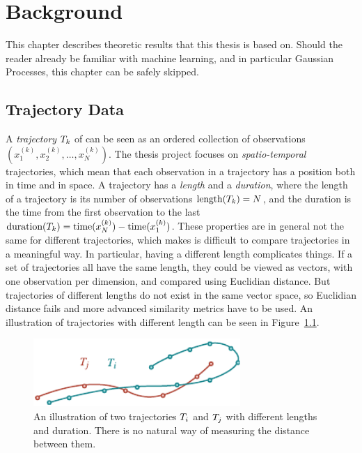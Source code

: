 \chapter{Background}
This chapter describes theoretic results that this thesis is based
on. Should the reader already be familiar with machine learning, and
in particular Gaussian Processes, this chapter can be safely skipped.

\section{Trajectory Data}
A \textit{trajectory} $T_{k}$ of can be seen as an ordered collection of
observations $(x^{(k)}_1, x^{(k)}_2, \dots, x^{(k)}_N)$.
The thesis project focuses on \textit{spatio-temporal}
trajectories, which mean that each observation in a trajectory has a position both in time
and in space. A trajectory has a \textit{length} and
a \textit{duration}, where the length of a trajectory is its number of
observations $\text{length}(T_{k}) = N$, and the duration is the time from the first
observation to the last $\text{duration}(T_{k}) = \text{time}(x^{(k)}_N) - \text{time}(x^{(k)}_1)$. 
These properties are in general not the same for different
trajectories, which makes is difficult to compare trajectories in a
meaningful way. In particular, having a different length complicates
things. If a set of trajectories all have the same length, they could
be viewed as vectors, with one observation per dimension, and compared
using Euclidian distance. But trajectories of different lengths do not
exist in the same vector space, so Euclidian distance fails and more
advanced similarity metrics have to be used.
An illustration of trajectories with different length can be seen in Figure~\ref{fig:trajectory-projection-problems}.
\begin{figure}
  \centering
  \includegraphics[width=0.7\textwidth]{figures/trajectory-projection-problems}
  \caption{An illustration of two trajectories $T_{i}$ and $T_{j}$
    with different lengths and duration. There is no natural way of
    measuring the distance between them.}\label{fig:trajectory-projection-problems}
\end{figure}

